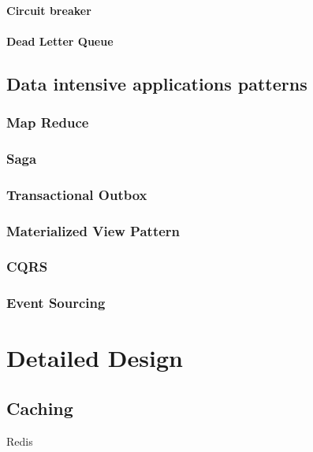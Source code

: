 \documentclass[a4paper, 11pt]{book}
\begin{document}
    \paragraph{Circuit breaker}

    \paragraph{Dead Letter Queue}

    \subsection{Data intensive applications patterns}

    \subsubsection{Map Reduce}

    \subsubsection{Saga}

    \subsubsection{Transactional Outbox}

    \subsubsection{Materialized View Pattern}

    \subsubsection{CQRS}

    \subsubsection{Event Sourcing}


    \section{Detailed Design}

    \subsection{Caching}
    Redis
\end{document}
